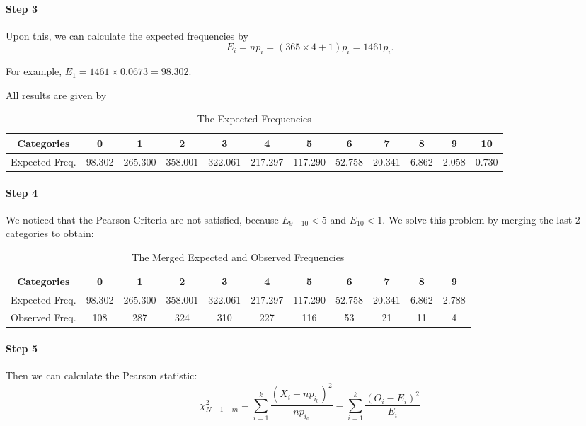 \documentclass[a4paper]{article}
\begin{document}
\paragraph{Step 3} Upon this, we can calculate the expected frequencies by 
$$E_i=np_i=(365\times 4+1)p_i=1461p_i.$$

For example, $E_1=1461\times 0.0673=98.302$.

All results are given by
\begin{table}[htbp]
  \centering
    \begin{tabular}{cccccccccccc}
    \hline
    Categories & 0     & 1     & 2     & 3     & 4     & 5     & 6     & 7     & 8     & 9     & 10 \\
    \hline
    Expected Freq. & 98.302  & 265.300  & 358.001  & 322.061  & 217.297  & 117.290  & 52.758  & 20.341  & 6.862  & 2.058  & 0.730  \\
    \hline
    \end{tabular}%
    \caption{The Expected Frequencies}
\end{table}%

\paragraph{Step 4} We noticed that the Pearson Criteria are not satisfied, because $E_{9-10}<5$ and $E_{10}<1$. We solve this problem by merging the last 2 categories to obtain:

\begin{table}[!htbp]
  \centering
    \begin{tabular}{ccccccccccc}
    \hline
    Categories & 0     & 1     & 2     & 3     & 4     & 5     & 6     & 7     & 8     & 9 \\
    \hline
    Expected Freq. & 98.302  & 265.300  & 358.001  & 322.061  & 217.297  & 117.290  & 52.758  & 20.341  & 6.862  & 2.788  \\
    \hline
    Observed Freq. & 108   & 287   & 324   & 310   & 227   & 116   & 53    & 21    & 11    & 4 \\
    \hline
    \end{tabular}%
    \caption{The Merged Expected and Observed Frequencies}
\end{table}%

\paragraph{Step 5}
Then we can calculate the Pearson statistic:
$$\chi_{N-1-m}^2 = \sum^k_{i=1}\frac{(X_i-np_{i_0})^2}{np_{i_0}}=\sum^k_{i=1}\frac{(O_i-E_i)^2}{E_i}$$
\end{document}
